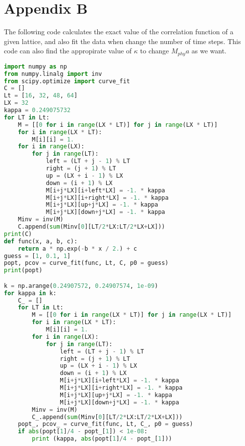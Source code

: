 \documentclass[12pt]{article}
\begin{document}
\section*{Appendix B}
The following code calculates the exact value of the correlation function of a given lattice, and also fit the data when change the number of time steps. This code can also find the appropirate value of $\kappa$ to change $M_{phy}a$ as we want. \\
\begin{lstlisting}[language=Python]
import numpy as np
from numpy.linalg import inv
from scipy.optimize import curve_fit
C = []
Lt = [16, 32, 48, 64]
LX = 32
kappa = 0.249075732
for LT in Lt: 
	M = [[0 for i in range(LX * LT)] for j in range(LX * LT)]
	for i in range(LX * LT): 
		M[i][i] = 1. 
	for i in range(LX): 
		for j in range(LT): 
			left = (LT + j - 1) % LT
			right = (j + 1) % LT
			up = (LX + i - 1) % LX
			down = (i + 1) % LX
			M[i+j*LX][i+left*LX] = -1. * kappa
			M[i+j*LX][i+right*LX] = -1. * kappa
			M[i+j*LX][up+j*LX] = -1. * kappa
			M[i+j*LX][down+j*LX] = -1. * kappa
	Minv = inv(M)
	C.append(sum(Minv[0][LT/2*LX:LT/2*LX+LX]))
print(C)
def func(x, a, b, c): 
	return a * np.exp(-b * x / 2.) + c
guess = [1, 0.1, 1]
popt, pcov = curve_fit(func, Lt, C, p0 = guess)
print(popt)

k = np.arange(0.24907572, 0.24907574, 1e-09)
for kappa in k: 
	C_ = []
	for LT in Lt: 
		M = [[0 for i in range(LX * LT)] for j in range(LX * LT)]
		for i in range(LX * LT): 
			M[i][i] = 1. 
		for i in range(LX): 
			for j in range(LT): 
				left = (LT + j - 1) % LT
				right = (j + 1) % LT
				up = (LX + i - 1) % LX
				down = (i + 1) % LX
				M[i+j*LX][i+left*LX] = -1. * kappa
				M[i+j*LX][i+right*LX] = -1. * kappa
				M[i+j*LX][up+j*LX] = -1. * kappa
				M[i+j*LX][down+j*LX] = -1. * kappa
		Minv = inv(M)
		C_.append(sum(Minv[0][LT/2*LX:LT/2*LX+LX]))
	popt_, pcov_ = curve_fit(func, Lt, C_, p0 = guess)
	if abs(popt[1]/4 - popt_[1]) < 1e-08: 
		print (kappa, abs(popt[1]/4 - popt_[1]))
\end{lstlisting}
\end{document}
